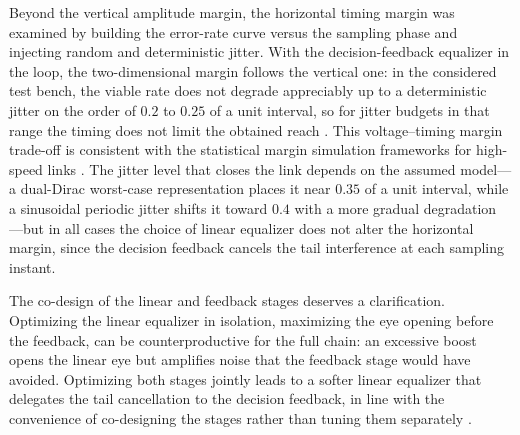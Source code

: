 \documentclass[preprint,review,12pt]{elsarticle}
\begin{document}
Beyond the vertical amplitude margin, the horizontal timing margin was
examined by building the error-rate curve versus the sampling phase and
injecting random and deterministic jitter. With the decision-feedback
equalizer in the loop, the two-dimensional margin follows the vertical
one: in the considered test bench, the viable rate does not degrade
appreciably up to a deterministic jitter on the order of $0.2$ to $0.25$
of a unit interval, so for jitter budgets in that range the timing does
not limit the obtained reach \citep{7202856,10584882}. This voltage--timing
margin trade-off is consistent with the statistical margin simulation
frameworks for high-speed links \citep{4509472}. The jitter level that
closes the link depends on the assumed model---a dual-Dirac worst-case
representation places it near $0.35$ of a unit interval, while a sinusoidal
periodic jitter shifts it toward $0.4$ with a more gradual degradation
\citep{805809,7571656}---but in all cases the choice of linear equalizer
does not alter the horizontal margin, since the decision feedback cancels
the tail interference at each sampling instant.

The co-design of the linear and feedback stages deserves a clarification.
Optimizing the linear equalizer in isolation, maximizing the eye opening
before the feedback, can be counterproductive for the full chain: an
excessive boost opens the linear eye but amplifies noise that the feedback
stage would have avoided. Optimizing both stages jointly leads to a softer
linear equalizer that delegates the tail cancellation to the decision
feedback, in line with the convenience of co-designing the stages rather
than tuning them separately \citep{11169790,11346689}.
\end{document}
